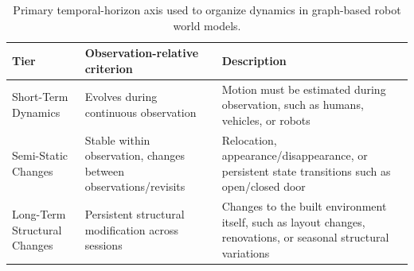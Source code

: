 \begin{table}[t]
\centering
\scriptsize
\setlength{\tabcolsep}{3pt}
\renewcommand{\arraystretch}{1.15}
\caption{Primary temporal-horizon axis used to organize dynamics in graph-based robot world models.}\label{tab:temporal_horizon_taxonomy}
    \begin{tabularx}{\columnwidth}{@{}p{} p{} X@{}}
    \toprule
    \textbf{Tier} & \textbf{Observation-relative criterion } & \textbf{Description} \\
    \midrule
    Short-Term Dynamics 
    &  Evolves during continuous observation 
    &  Motion must be estimated during observation, such as humans, vehicles, or robots \\ 
    \midrule
    Semi-Static Changes 
    &  Stable within observation, changes between observations/revisits 
    &  Relocation, appearance/disappearance, or persistent state transitions such as open/closed door \\ 
    \midrule
    Long-Term Structural Changes 
    &  Persistent structural modification across sessions 
    &  Changes to the built environment itself, such as layout changes, renovations, or seasonal structural variations  \\
    \bottomrule
    \end{tabularx}
\end{table}

